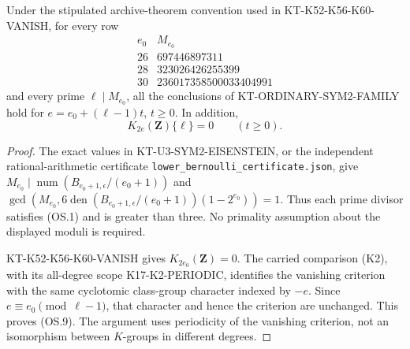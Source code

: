 \begin{corollary}
Under the stipulated archive-theorem convention used in
KT-K52-K56-K60-VANISH, for every row
\[
\begin{array}{c|r}
e_0&M_{e_0}\\\hline
26&697446897311\\
28&323026426255399\\
30&236017358500033404991
\end{array}                                                   \tag{OS.8}
\]
and every prime $\ell\mid M_{e_0}$, all the conclusions of
KT-ORDINARY-SYM2-FAMILY hold for
$e=e_0+(\ell-1)t$, $t\geq0$. In addition,
\[
                  K_{2e}(\mathbf Z)\{\ell\}=0
                           \qquad(t\geq0).                   \tag{OS.9}
\]
\end{corollary}
\begin{proof}
The exact values in KT-U3-SYM2-EISENSTEIN, or the independent
rational-arithmetic certificate
\texttt{lower\_bernoulli\_certificate.json}, give
$M_{e_0}\mid\operatorname{num}(B_{e_0+1,\epsilon}/(e_0+1))$
and
$\gcd(M_{e_0},6\operatorname{den}(B_{e_0+1,\epsilon}/(e_0+1))
 (1-2^{e_0}))=1$.
Thus each prime divisor satisfies (OS.1) and is greater than
three. No primality assumption about the displayed moduli
is required.

KT-K52-K56-K60-VANISH gives $K_{2e_0}(\mathbf Z)=0$.
The carried comparison (K2), with its all-degree scope
K17-K2-PERIODIC, identifies the vanishing criterion with the
same cyclotomic class-group character indexed by $-e$.
Since $e\equiv e_0\pmod{\ell-1}$, that character and hence
the criterion are unchanged. This proves (OS.9). The
argument uses periodicity of the vanishing criterion, not
an isomorphism between $K$-groups in different degrees.
\end{proof}

